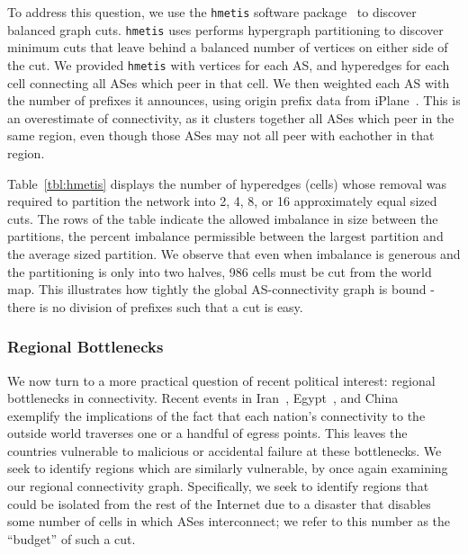     To address this question, we use the {\tt hmetis} software package~\cite{hmetis} to discover balanced graph cuts.
    {\tt hmetis} uses performs hypergraph partitioning to discover minimum cuts that leave behind a balanced number of vertices on either side of the cut.
    We provided {\tt hmetis} with vertices for each AS, and hyperedges for each cell connecting all ASes which peer in that cell. 
    We then weighted each AS with the number of prefixes it announces, using origin prefix data from iPlane~\cite{iplane}.
    This is an overestimate of connectivity, as it clusters together all ASes which peer in the same region, even though those ASes may not all peer with eachother in that region.
 
    Table~\ref{tbl:hmetis} displays the number of hyperedges (cells) whose removal was required to partition the network into  2, 4, 8, or 16 approximately equal sized cuts. 
    The rows of the table indicate the allowed imbalance in size between the partitions, the percent imbalance permissible between the largest partition and the average sized partition.
    We observe that even when imbalance is generous and the partitioning is only into two halves, 986 cells must be cut from the world map.
    This illustrates how tightly the global AS-connectivity graph is bound - there is no division of prefixes such that a cut is easy.
    
    \subsubsection*{Regional Bottlenecks}
    We now turn to a more practical question of recent political interest: regional bottlenecks in connectivity.
    Recent events in Iran~\cite{iran}, Egypt~\cite{egypt}, and China~\cite{china} exemplify the implications of the fact that each nation's connectivity to the outside world traverses one or a handful of egress points.
    This leaves the countries vulnerable to malicious or accidental failure at these bottlenecks.
    We seek to identify regions which are similarly vulnerable, by once again examining our regional connectivity graph. 
    Specifically, we seek to identify regions that could be isolated from the rest of the Internet due to a disaster that disables some number of cells in which ASes interconnect; we refer to this number as the ``budget'' of such a cut.

